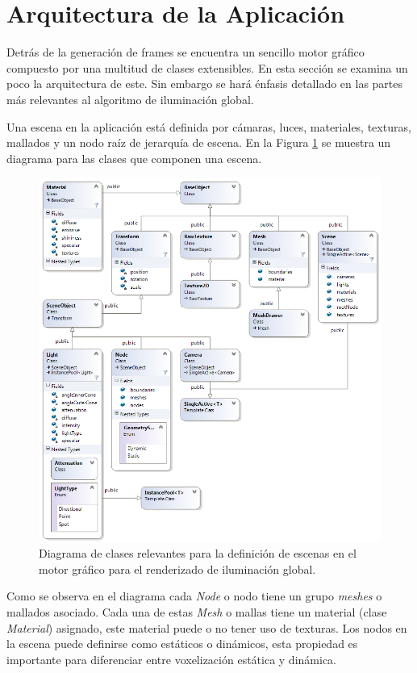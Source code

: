 \section{Arquitectura de la Aplicación} %
\label{sec:arquitectura_de_la_aplicacion}
Detrás de la generación de frames se encuentra un sencillo motor gráfico compuesto por una multitud de clases extensibles. En esta sección se examina un poco la arquitectura de este. Sin embargo se hará énfasis detallado en las partes más relevantes al algoritmo de iluminación global.

Una escena en la aplicación está definida por cámaras, luces, materiales, texturas, mallados y un nodo raíz de jerarquía de escena. En la Figura \ref{fig:scene_class_diagram} se muestra un diagrama para las clases que componen una escena.

\begin{figure}[H]
	\centering
	\captionsetup{justification=centering}
	\includegraphics[width=\linewidth]{media/ClassDiagram1.png}
	\caption{Diagrama de clases relevantes para la definición de escenas en el motor gráfico para el renderizado de iluminación global.}
	\label{fig:scene_class_diagram}
\end{figure}

Como se observa en el diagrama cada \emph{Node} o nodo tiene un grupo \emph{meshes} o mallados asociado. Cada una de estas \emph{Mesh} o mallas tiene un material (clase \emph{Material}) asignado, este material puede o no tener uso de texturas. Los nodos en la escena puede definirse como estáticos o dinámicos, esta propiedad es importante para diferenciar entre voxelización estática y dinámica.

